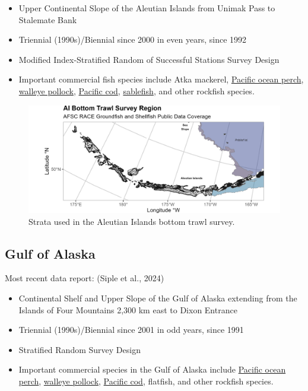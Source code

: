 \documentclass[
  letterpaper,
  oneside,
  open=any]{scrbook}
\providecommand{\tightlist}{%
  \setlength{\itemsep}{0pt}\setlength{\parskip}{0pt}}\usepackage{longtable,booktabs,array}
\begin{document}
\begin{itemize}
\tightlist
\item
  Upper Continental Slope of the Aleutian Islands from Unimak Pass to
  Stalemate Bank
\item
  Triennial (1990s)/Biennial since 2000 in even years, since 1992
\item
  Modified Index-Stratified Random of Successful Stations Survey Design
\item
  Important commercial fish species include Atka mackerel,
  \href{https://www.fisheries.noaa.gov/species/pacific-ocean-perch}{Pacific
  ocean perch},
  \href{https://www.fisheries.noaa.gov/species/alaska-pollock}{walleye
  pollock},
  \href{https://www.fisheries.noaa.gov/species/pacific-cod}{Pacific
  cod},
  \href{https://www.fisheries.noaa.gov/species/sablefish}{sablefish},
  and other rockfish species.
\end{itemize}

\begin{figure}[H]

{\centering \includegraphics[width=7in,height=\textheight]{content/../img/survey_plot_ai.png}

}

\caption{Strata used in the Aleutian Islands bottom trawl survey.}

\end{figure}%

\subsection{\texorpdfstring{\textbf{Gulf of
Alaska}}{Gulf of Alaska}}\label{gulf-of-alaska}

Most recent data report: (Siple et al., 2024)

\begin{itemize}
\tightlist
\item
  Continental Shelf and Upper Slope of the Gulf of Alaska extending from
  the Islands of Four Mountains 2,300 km east to Dixon Entrance
\item
  Triennial (1990s)/Biennial since 2001 in odd years, since 1991
\item
  Stratified Random Survey Design
\item
  Important commercial species in the Gulf of Alaska include
  \href{https://www.fisheries.noaa.gov/species/pacific-ocean-perch}{Pacific
  ocean perch},
  \href{https://www.fisheries.noaa.gov/species/alaska-pollock}{walleye
  pollock},
  \href{https://www.fisheries.noaa.gov/species/pacific-cod}{Pacific
  cod}, flatfish, and other rockfish species.
\end{itemize}
\end{document}
